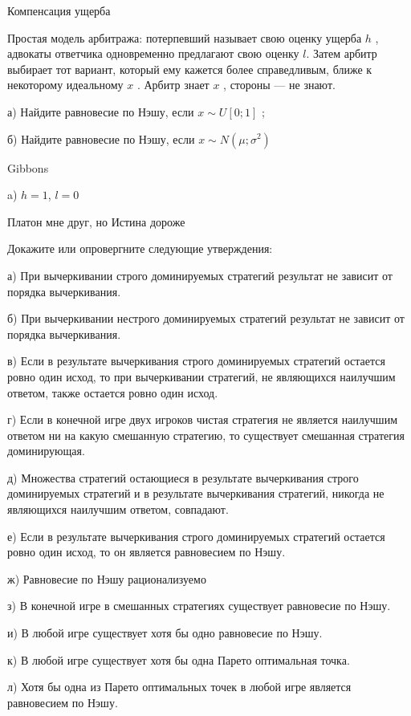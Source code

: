 \begin{problem}
 Компенсация ущерба \par
Простая модель арбитража: потерпевший называет свою оценку ущерба  $h$ , адвокаты ответчика одновременно предлагают свою оценку  $l$. Затем арбитр выбирает тот вариант, который ему кажется более справедливым, ближе к некоторому идеальному  $x$ . Арбитр знает  $x$ , стороны — не знают.\par
а) Найдите равновесие по Нэшу, если  $x\sim U\left[0;1\right]$ ;\par
б) Найдите равновесие по Нэшу, если  $x\sim N\left(\mu ;\sigma ^{2} \right)$



\begin{source}
Gibbons
\end{source}


\begin{sol}
a) $h=1$, $l=0$
\end{sol}
\end{problem}



\begin{problem}
 Платон мне друг, но Истина дороже\par
Докажите или опровергните следующие утверждения:\par
а)	При вычеркивании строго доминируемых стратегий результат не зависит от порядка вычеркивания.\par
б)	При вычеркивании нестрого доминируемых стратегий результат не зависит от порядка вычеркивания.\par
в)	Если в результате вычеркивания строго доминируемых стратегий остается ровно один исход, то при вычеркивании стратегий, не являющихся наилучшим ответом, также остается ровно один исход.\par
г)	Если в конечной игре двух игроков чистая стратегия  не является наилучшим ответом ни на какую смешанную стратегию, то существует смешанная стратегия доминирующая.\par
д)	Множества стратегий остающиеся в результате вычеркивания строго доминируемых стратегий и в результате вычеркивания стратегий, никогда не являющихся наилучшим ответом, совпадают.\par
е)	Если в результате вычеркивания строго доминируемых стратегий остается ровно один исход, то он является равновесием по Нэшу.\par
ж)	Равновесие по Нэшу рационализуемо\par
з)	В конечной игре в смешанных стратегиях существует равновесие по Нэшу.\par
и)	В любой игре существует хотя бы одно равновесие по Нэшу.\par
к)	В любой игре существует хотя бы одна Парето оптимальная точка.\par
л)	Хотя бы одна из Парето оптимальных точек в любой игре является равновесием по Нэшу.



\begin{sol}

\end{sol}
\end{problem}



